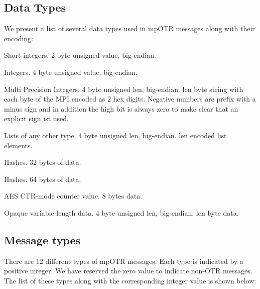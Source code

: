 \subsection{Data Types}
We present a list of several data types used in mpOTR messages along with their encoding:
\begin{description}[align=left]
\item [SHORT] Short integers. 2 byte unsigned value, big-endian.
\item [INT] Integers. 4 byte unsigned value, big-endian.
\item [MPI] Multi Precision Integers. 4 byte unsigned len, big-endian. len byte string with each byte of the MPI encoded as 2 hex digits. Negative numbers are prefix with a minus sign and in addition the high bit is always zero to make clear that an explicit sign ist used.
\item [LIST] Lists of any other type. 4 byte unsigned len, big-endian. len encoded list elements.
\item[HASH32] Hashes. 32 bytes of data.
\item[HASH64] Hashes. 64 bytes of data.
\item[CTR] AES CTR-mode counter value. 8 bytes data.
\item[DATA] Opaque variable-length data. 4 byte unsigned len, big-endian. len byte data.
\end{description}

\subsection{Message types}
\label{subsections:message_types}
There are 12 different types of mpOTR messages. Each type is indicated by a positive integer. We have reserved the zero value to indicate non-OTR messages. The list of these types along with the corresponding integer value is shown below:

